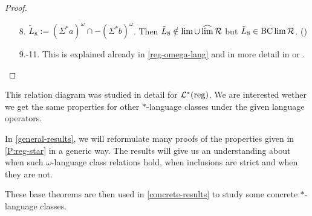 \begin{lemma}
\begin{proof}
\begin{enumerate}
\item[8.]
$\tilde{L}_8 := (\Sigma^*a)^\omega \cap -(\Sigma^*b)^\omega$. Then $\tilde{L}_8 \notin \lim \cup \operatorname{\widehat{lim}} \mathcal{R}$ but $\tilde{L}_8 \in \operatorname{BC} \lim \mathcal{R}$. (\cite[prop, p.38]{InfCompR101})

\item[9.-11.]
This is explained already in \cref{reg-omega-lang} and in more detail in \cite{InfCompR101} or \cite[Theorem 3.1]{CombR107}.

\end{enumerate}
\end{proof}
\end{lemma}


This relation diagram was studied in detail for $\mathcal{L}^*(\textup{\textrm{reg}})$. We are interested wether we get the same properties for other $*$-language classes under the given language operators.


In \cref{general-results}, we will reformulate many proofs of the properties given in \cref{P:reg-star} in a generic way. The results will give us an understanding about when such $\omega$-language class relations hold, when inclusions are strict and when they are not.

These base theorems are then used in \cref{concrete-results} to study some concrete $*$-language classes.
